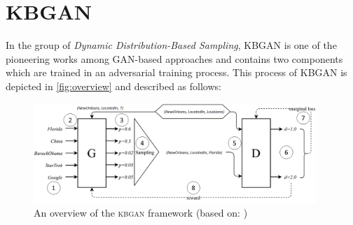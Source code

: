 \section{KBGAN} 
\label{sec:kbgan}

In the group of \textit{Dynamic Distribution-Based Sampling}, \ac{KBGAN} is one of the pioneering works among \ac{GAN}-based approaches and contains two components which are trained in an adversarial training process.
This process of \ac{KBGAN} is depicted in \autoref{fig:overview} and described as follows:
\begin{figure}[t]
  \centering
    \includegraphics[width=0.95\textwidth]{figures/kbgan_original.png}
  \caption{An overview of the \textsc{kbgan} framework (based on: \cite{cai2017kbgan})}
  \label{fig:overview}
\end{figure}

